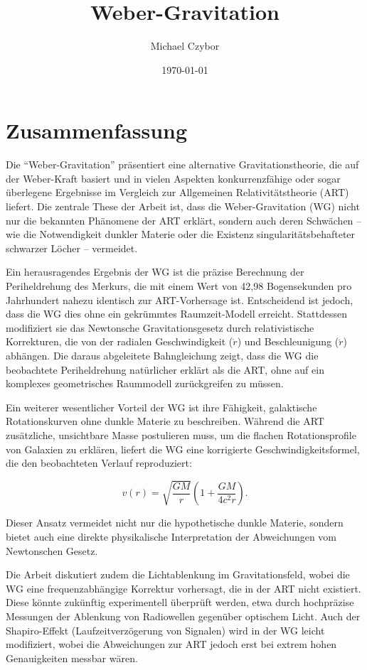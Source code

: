 \documentclass[10pt,oneside,openright]{book} %
\numberwithin{equation}{section}
\begin{document}
\title{Weber-Gravitation}
\author{Michael Czybor}
\date{\today}
\maketitle

\section*{Zusammenfassung}
Die \enquote{Weber-Gravitation} präsentiert eine alternative Gravitationstheorie, die auf der Weber-Kraft basiert und in vielen Aspekten konkurrenzfähige
oder sogar überlegene Ergebnisse im Vergleich zur Allgemeinen Relativitätstheorie \cite{einstein1915} (ART) liefert. Die zentrale These der Arbeit ist, dass die
Weber-Gravitation (WG) nicht nur die bekannten Phänomene der ART erklärt, sondern auch deren Schwächen – wie die Notwendigkeit dunkler Materie
oder die Existenz singularitätsbehafteter schwarzer Löcher – vermeidet.

Ein herausragendes Ergebnis der WG ist die präzise Berechnung der Periheldrehung des Merkurs, die mit einem Wert von 42,98 Bogensekunden pro Jahrhundert
nahezu identisch zur ART-Vorhersage ist. Entscheidend ist jedoch, dass die WG dies ohne ein gekrümmtes Raumzeit-Modell erreicht. Stattdessen modifiziert
sie das Newtonsche Gravitationsgesetz durch relativistische Korrekturen, die von der radialen Geschwindigkeit (\(\dot{r}\)) und Beschleunigung (\(\ddot{r}\)) abhängen.
Die daraus abgeleitete Bahngleichung zeigt, dass die WG die beobachtete Periheldrehung natürlicher erklärt als die ART, ohne auf ein komplexes geometrisches
Raummodell zurückgreifen zu müssen.

Ein weiterer wesentlicher Vorteil der WG ist ihre Fähigkeit, galaktische Rotationskurven ohne dunkle Materie zu beschreiben. Während die ART zusätzliche,
unsichtbare Masse postulieren muss, um die flachen Rotationsprofile von Galaxien zu erklären, liefert die WG eine korrigierte Geschwindigkeitsformel,
die den beobachteten Verlauf reproduziert:  

\[
v(r) = \sqrt{\frac{GM}{r}} \left(1 + \frac{GM}{4c^2r}\right).
\]  

Dieser Ansatz vermeidet nicht nur die hypothetische dunkle Materie, sondern bietet auch eine direkte physikalische Interpretation der Abweichungen vom Newtonschen Gesetz.

Die Arbeit diskutiert zudem die Lichtablenkung im Gravitationsfeld, wobei die WG eine frequenzabhängige Korrektur vorhersagt, die in der ART nicht existiert.
Diese könnte zukünftig experimentell überprüft werden, etwa durch hochpräzise Messungen der Ablenkung von Radiowellen gegenüber optischem Licht. Auch der
Shapiro-Effekt \cite{shapiro1964} (Laufzeitverzögerung von Signalen) wird in der WG leicht modifiziert, wobei die Abweichungen zur ART jedoch erst bei extrem hohen Genauigkeiten messbar wären.  
\end{document}
